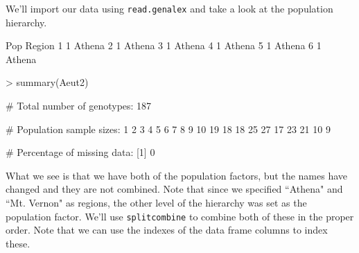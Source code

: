 \documentclass[letterpaper]{article}
\begin{document}
We'll import our data using \texttt{read.genalex} and take a look at the population hierarchy.
\begin{Schunk}
\begin{Soutput}
  Pop Region
1   1 Athena
2   1 Athena
3   1 Athena
4   1 Athena
5   1 Athena
6   1 Athena
\end{Soutput}
\begin{Sinput}
> summary(Aeut2)
\end{Sinput}
\begin{Soutput}
 # Total number of genotypes:  187 

 # Population sample sizes:  
 1  2  3  4  5  6  7  8  9 10 
19 18 18 25 27 17 23 21 10  9 

 # Percentage of missing data:  
[1] 0
\end{Soutput}
\end{Schunk}
What we see is that we have both of the population factors, but the names have changed and they are not combined. Note that since we specified ``Athena" and ``Mt. Vernon" as regions, the other level of the hierarchy was set as the population factor. We'll use \texttt{splitcombine} to combine both of these in the proper order. Note that we can use the indexes of the data frame columns to index these.
\end{document}
